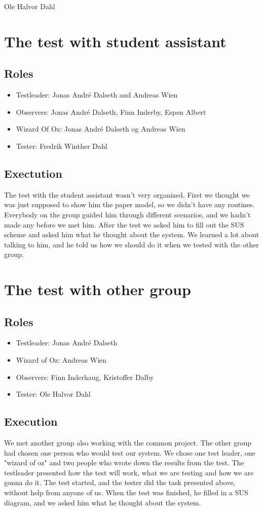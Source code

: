 \documentclass{article}
\begin{document}
Ole Halvor Dahl






\section{The test with student assistant}
\subsection{Roles}
\begin{itemize}
\item Testleader: Jonas André Dalseth and Andreas Wien
\item Observers: Jonas André Dalseth, Finn Inderby, Espen Albert
\item Wizard Of Oz: Jonas André Dalseth og Andreas Wien
\item Tester: Fredrik Winther Dahl
\end{itemize}

\subsection{Exectution}
The test with the student assistant wasn't very organized. First we thought we was just supposed to show him the paper model, so we didn't have any routines. Everybody on the group guided him through different scenarios, and we hadn't made any before we met him. After the test we asked him to fill out the SUS scheme and asked him what he thought about the system. We learned a lot about talking to him, and he told us how we should do it when we tested with the other group. 
\section{The test with other group}
\subsection{Roles}
\begin{itemize}
\item Testleader: Jonas André Dalseth
\item Wizard of Oz: Andreas Wien
\item Observers: Finn Inderhaug, Kristoffer Dalby
\item Tester: Ole Halvor Dahl
\end{itemize}

\subsection{Execution}
We met another group also working with the common project. The other group had chosen one person who would test our system. We chose one test leader, one "wizard of oz" and two people who wrote down the results from the test. The testleader presented how the test will work, what we are testing and how we are gonna do it. The test started, and the tester did the task presented above, without help from anyone of us. When the test was finished, he filled in a SUS diagram, and we asked him what he thought about the system.
\end{document}

